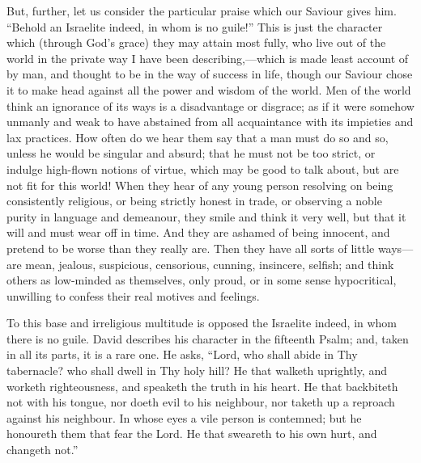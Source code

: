 But, further, let us consider the particular praise which our Saviour
gives him. ``Behold an Israelite indeed, in whom is no guile!''
This is just the character which (through God's grace) they may attain
most fully, who live out of the world in the private way I have been
describing,—which is made least account of by man, and thought to be
in the way of success in life, though our Saviour chose it to make head
against all the power and wisdom of the world. Men of the world think an
ignorance of its ways is a disadvantage or disgrace; as if it were
somehow unmanly and weak to have abstained from all acquaintance with
its impieties and lax practices. How often do we hear them say that a
man must do so and so, unless he would be singular and absurd; that he
must not be too strict, or indulge high-flown notions of virtue, which
may be good to talk about, but are not fit for this world! When they
hear of any young person resolving on being consistently religious, or
being strictly honest in trade, or observing a noble purity in language
and demeanour, they smile and think it very well, but that it will and
must wear off in time. And they are ashamed of being innocent, and
pretend to be worse than they really are. Then they have all sorts of
little ways—are mean, jealous, suspicious, censorious, cunning,
insincere, selfish; and think others as low-minded as themselves, only
proud, or in some sense hypocritical, unwilling to confess their real
motives and feelings.

To this base and irreligious multitude is opposed the Israelite
indeed, in whom there is no guile. David describes his character in the
fifteenth Psalm; and, taken in all its parts, it is a rare one. He asks,
``Lord, who shall abide in Thy tabernacle? who shall dwell in Thy
holy hill? He that walketh uprightly, and worketh righteousness, and
speaketh the truth in his heart. He that backbiteth not with his tongue,
nor doeth evil to his neighbour, nor taketh up a reproach against his
neighbour. In whose eyes a vile person is contemned; but he honoureth
them that fear the Lord. He that sweareth to his own hurt, and changeth
not.''

